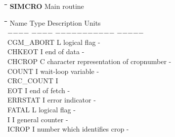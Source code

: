 \documentclass[11pt]{article}
\begin{document}
\bigskip
\bigskip
\bigskip
\bigskip
\bigskip
\bigskip
\bigskip
\nwln
\begin{tabbing}
\hspace{1.27cm}\=\hspace{1.27cm}\=\hspace{1.27cm}\=\hspace{1.27cm}\=%
\hspace{1.27cm}\=\hspace{1.27cm}\=\hspace{1.27cm}\=\hspace{1.27cm}\=%
\hspace{1.27cm}\=\hspace{1.27cm}\=\kill
{\bf SIMCRO}\> \> Main routine
\end{tabbing}
\nwln
\begin{tabbing}
\hspace{1.27cm}\=\hspace{1.27cm}\=\hspace{1.27cm}\=\hspace{1.27cm}\=%
\hspace{1.27cm}\=\hspace{1.27cm}\=\hspace{1.27cm}\=\hspace{1.27cm}\=%
\hspace{1.27cm}\=\hspace{1.27cm}\=\kill
Name    \> \> Type   \> Description                                        \> \> \> \> \> \> \> Units\\
$-$$-$$-$$-$    \> \> $-$$-$$-$$-$   \> $-$$-$$-$$-$$-$$-$$-$$-$$-$$-$$-$                                        \> \> \> \> \> \> \> $-$$-$$-$$-$$-$\\
CGM\_ABORT\> \> L\> logical flag\> \> \> \> \> \> \> -\\
CHKEOT\> \> I\> end of data\> \> \> \> \> \> \> -\\
CHCROP\> \> C\> character representation of cropnumber\> \> \> \> \> \> \> -\\
COUNT\> \> I\> wait-loop variable\> \> \> \> \> \> \> -\\
CRC\_COUNT\> \> I\> \\
EOT\> \> I\> end of fetch\> \> \> \> \> \> \> -\\
ERRSTAT\> \> I\> error indicator\> \> \> \> \> \> \> -\\
FATAL\> \> L\> logical flag\> \> \> \> \> \> \> -\\
I\> \> I\> general counter\> \> \> \> \> \> \> -\\
ICROP\> \> I\> number which identifies crop\> \> \> \> \> \> \> -
\end{tabbing}
\end{document}
